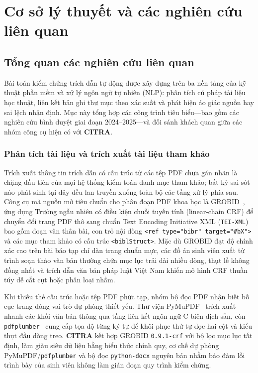 \chapter{Cơ sở lý thuyết và các nghiên cứu liên quan}
\label{chap:background}

\section{Tổng quan các nghiên cứu liên quan}

Bài toán kiểm chứng trích dẫn tự động được xây dựng trên ba nền tảng của kỹ thuật phần mềm và xử lý ngôn ngữ tự nhiên (NLP): phân tích cú pháp tài liệu học thuật, liên kết bản ghi thư mục theo xác suất và phát hiện ảo giác nguồn hay sai lệch nhận định. Mục này tổng hợp các công trình tiêu biểu---bao gồm các nghiên cứu bình duyệt giai đoạn 2024--2025---và đối sánh khách quan giữa các nhóm công cụ hiện có với \textbf{CITRA}.

\subsection{Phân tích tài liệu và trích xuất tài liệu tham khảo}

Trích xuất thông tin trích dẫn có cấu trúc từ các tệp PDF chưa gán nhãn là chặng đầu tiên của mọi hệ thống kiểm toán danh mục tham khảo; bất kỳ sai sót nào phát sinh tại đây đều lan truyền xuống toàn bộ các tầng xử lý phía sau. Công cụ mã nguồn mở tiêu chuẩn cho phân đoạn PDF khoa học là GROBID~\cite{Lopez2009}, ứng dụng Trường ngẫu nhiên có điều kiện chuỗi tuyến tính (linear-chain CRF) để chuyển đổi trang PDF thô sang chuẩn Text Encoding Initiative XML (\texttt{TEI-XML}) bao gồm đoạn văn thân bài, con trỏ nội dòng \texttt{<ref type="bibr" target="\#bX">} và các mục tham khảo có cấu trúc \texttt{<biblStruct>}. Mặc dù GROBID đạt độ chính xác cao trên bài báo tạp chí dàn trang chuẩn mực, các đồ án sinh viên xuất từ trình soạn thảo văn bản thường chứa mục lục trải dài nhiều dòng, thụt lề không đồng nhất và trích dẫn văn bản pháp luật Việt Nam khiến mô hình CRF thuần túy dễ cắt cụt hoặc phân loại nhầm.

Khi thiếu thẻ cấu trúc hoặc tệp PDF phức tạp, nhóm bộ đọc PDF nhận biết bố cục trang đóng vai trò dự phòng thiết yếu. Thư viện PyMuPDF~\cite{PyMuPDF2024} trích xuất nhanh các khối văn bản thông qua tầng liên kết ngôn ngữ C biên dịch sẵn, còn \texttt{pdfplumber}~\cite{Pdfplumber2024} cung cấp tọa độ từng ký tự để khôi phục thứ tự đọc hai cột và kiểu thụt đầu dòng treo. \textbf{CITRA} kết hợp GROBID \texttt{0.9.1-crf} với bộ lọc mục lục tất định, làm giàu siêu dữ liệu bằng biểu thức chính quy, cơ chế dự phòng PyMuPDF/\texttt{pdfplumber} và bộ đọc \texttt{python-docx} nguyên bản nhằm bảo đảm lỗi trình bày của sinh viên không làm gián đoạn quy trình kiểm chứng.

